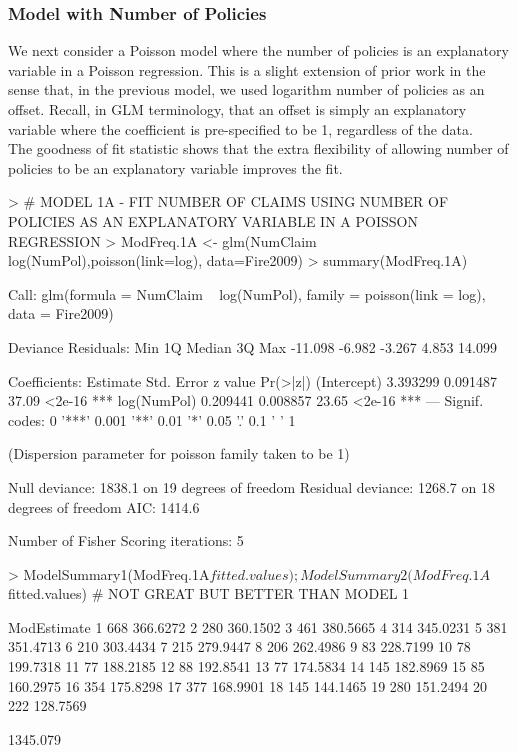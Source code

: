 \documentclass[12pt,letterpaper]{article}
\begin{document}
\subsubsection{Model with Number of Policies}

We next consider a Poisson model where the number of policies is an explanatory variable in a Poisson regression.
This is a slight extension of prior work in the sense that, in the previous model, we used logarithm number of policies
as an offset. Recall, in GLM terminology, that an offset is simply an explanatory variable where the coefficient is
pre-specified to be 1, regardless of the data.\\

The goodness of fit statistic shows that the extra flexibility of allowing
number of policies to be an explanatory variable improves the fit.

\begin{Schunk}
\begin{Sinput}
> #  MODEL 1A - FIT NUMBER OF CLAIMS USING NUMBER OF POLICIES AS AN EXPLANATORY VARIABLE IN A POISSON REGRESSION
> ModFreq.1A <- glm(NumClaim ~ log(NumPol),poisson(link=log), data=Fire2009)
> summary(ModFreq.1A)
\end{Sinput}
\begin{Soutput}
Call:
glm(formula = NumClaim ~ log(NumPol), family = poisson(link = log), 
    data = Fire2009)

Deviance Residuals: 
    Min       1Q   Median       3Q      Max  
-11.098   -6.982   -3.267    4.853   14.099  

Coefficients:
            Estimate Std. Error z value Pr(>|z|)    
(Intercept) 3.393299   0.091487   37.09   <2e-16 ***
log(NumPol) 0.209441   0.008857   23.65   <2e-16 ***
---
Signif. codes:  0 '***' 0.001 '**' 0.01 '*' 0.05 '.' 0.1 ' ' 1

(Dispersion parameter for poisson family taken to be 1)

    Null deviance: 1838.1  on 19  degrees of freedom
Residual deviance: 1268.7  on 18  degrees of freedom
AIC: 1414.6

Number of Fisher Scoring iterations: 5
\end{Soutput}
\begin{Sinput}
> ModelSummary1(ModFreq.1A$fitted.values);ModelSummary2(ModFreq.1A$fitted.values) #  NOT GREAT BUT BETTER THAN MODEL 1
\end{Sinput}
\begin{Soutput}
       ModEstimate
1  668    366.6272
2  280    360.1502
3  461    380.5665
4  314    345.0231
5  381    351.4713
6  210    303.4434
7  215    279.9447
8  206    262.4986
9   83    228.7199
10  78    199.7318
11  77    188.2185
12  88    192.8541
13  77    174.5834
14 145    182.8969
15  85    160.2975
16 354    175.8298
17 377    168.9901
18 145    144.1465
19 280    151.2494
20 222    128.7569
\end{Soutput}
\begin{Soutput}
[1] 1345.079
\end{Soutput}
\end{Schunk}
\end{document}
